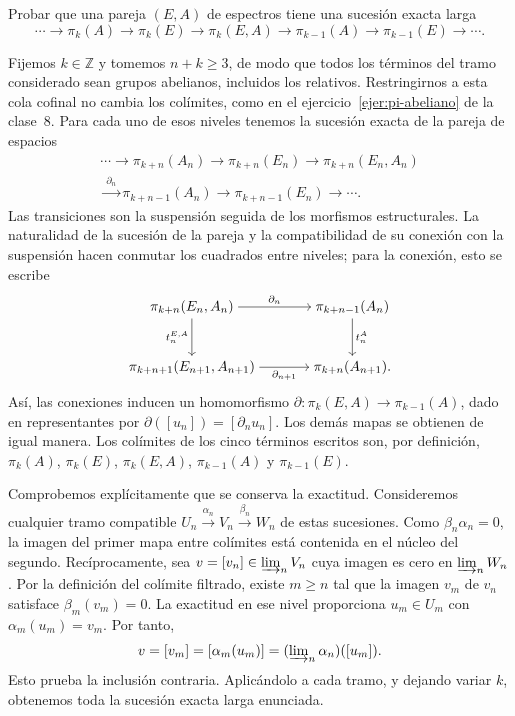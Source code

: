\begin{ejer}\label{ejer:c12-sucesion-relativa}
Probar que una pareja $(E,A)$ de espectros tiene una sucesión exacta larga
\[
\cdots\longrightarrow\pi_k(A)\longrightarrow\pi_k(E)
\longrightarrow\pi_k(E,A)\longrightarrow\pi_{k-1}(A)
\longrightarrow\pi_{k-1}(E)\longrightarrow\cdots.
\]
\end{ejer}
\begin{sol}
Fijemos $k\in\mathbb Z$ y tomemos $n+k\ge3$, de modo que todos los términos del tramo considerado sean grupos abelianos, incluidos los relativos. Restringirnos a esta cola cofinal no cambia los colímites, como en el ejercicio~\ref{ejer:pi-abeliano} de la clase~8. Para cada uno de esos niveles tenemos la sucesión exacta de la pareja de espacios
\[
\begin{aligned}
\cdots\longrightarrow\pi_{k+n}(A_n)\longrightarrow\pi_{k+n}(E_n)
\longrightarrow\pi_{k+n}(E_n,A_n)\\
\xrightarrow{\ \partial_n\ }\pi_{k+n-1}(A_n)
\longrightarrow\pi_{k+n-1}(E_n)\longrightarrow\cdots.
\end{aligned}
\]
Las transiciones son la suspensión seguida de los morfismos estructurales. La naturalidad de la sucesión de la pareja y la compatibilidad de su conexión con la suspensión hacen conmutar los cuadrados entre niveles; para la conexión, esto se escribe
\[
\begin{tikzcd}[cramped,column sep=large,row sep=large]
\pi_{k+n}(E_n,A_n) \arrow[r,"\partial_n"] \arrow[d,"t_n^{E,A}"']
& \pi_{k+n-1}(A_n) \arrow[d,"t_n^A"]\\
\pi_{k+n+1}(E_{n+1},A_{n+1}) \arrow[r,"\partial_{n+1}"']
& \pi_{k+n}(A_{n+1}).
\end{tikzcd}
\]
Así, las conexiones inducen un homomorfismo $\partial\colon\pi_k(E,A)\to\pi_{k-1}(A)$, dado en representantes por $\partial([u_n])=[\partial_nu_n]$. Los demás mapas se obtienen de igual manera. Los colímites de los cinco términos escritos son, por definición, $\pi_k(A)$, $\pi_k(E)$, $\pi_k(E,A)$, $\pi_{k-1}(A)$ y $\pi_{k-1}(E)$.

Comprobemos explícitamente que se conserva la exactitud. Consideremos cualquier tramo compatible $U_n\xrightarrow{\alpha_n}V_n\xrightarrow{\beta_n}W_n$ de estas sucesiones. Como $\beta_n\alpha_n=0$, la imagen del primer mapa entre colímites está contenida en el núcleo del segundo. Recíprocamente, sea $v=[v_n]\in\varinjlim\nolimits_nV_n$ cuya imagen es cero en $\varinjlim\nolimits_nW_n$. Por la definición del colímite filtrado, existe $m\ge n$ tal que la imagen $v_m$ de $v_n$ satisface $\beta_m(v_m)=0$. La exactitud en ese nivel proporciona $u_m\in U_m$ con $\alpha_m(u_m)=v_m$. Por tanto,
\[
v=[v_m]=[\alpha_m(u_m)]
=(\varinjlim\nolimits_n\alpha_n)([u_m]).
\]
Esto prueba la inclusión contraria. Aplicándolo a cada tramo, y dejando variar $k$, obtenemos toda la sucesión exacta larga enunciada.
\end{sol}

